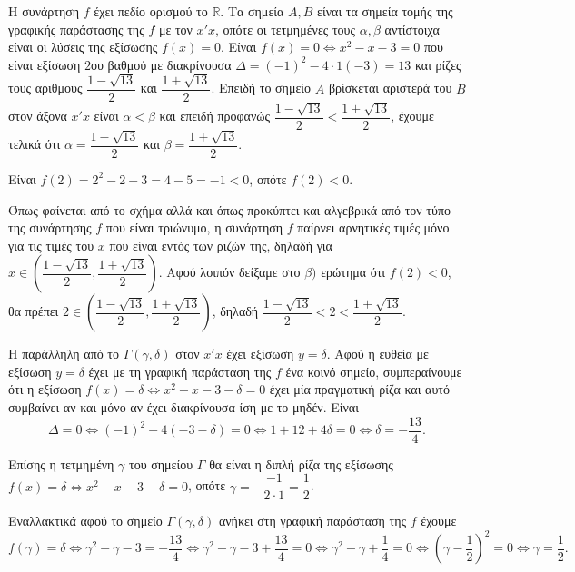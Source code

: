 
\begin{alist}
\item Η συνάρτηση $f$ έχει πεδίο ορισμού το $\mathbb{R}$. Τα σημεία $A, B$ είναι τα σημεία τομής της γραφικής παράστασης της $f$ με τον $x'x$, οπότε οι τετμημένες τους $\alpha, \beta$ αντίστοιχα είναι οι λύσεις της εξίσωσης $f(x) = 0$. Είναι $f(x) = 0 \Leftrightarrow x^2 - x - 3 = 0$
που είναι εξίσωση $2$ου βαθμού με διακρίνουσα $\Delta = (-1)^2 - 4 \cdot 1(-3) = 13$ και ρίζες τους αριθμούς
$\dfrac{1 - \sqrt{13}}{2}$ και $\dfrac{1 + \sqrt{13}}{2}$. Επειδή το σημείο $A$ βρίσκεται αριστερά του $B$ στον άξονα
$x'x$ είναι $\alpha < \beta$ και επειδή προφανώς $\dfrac{1 - \sqrt{13}}{2} < \dfrac{1 + \sqrt{13}}{2}$, έχουμε τελικά ότι $\alpha = \dfrac{1 - \sqrt{13}}{2}$ και $\beta = \dfrac{1 + \sqrt{13}}{2}$.

\item Είναι $f(2) = 2^2 - 2 - 3 = 4 - 5 = -1 < 0$, οπότε $f(2) < 0$.

\item Όπως φαίνεται από το σχήμα αλλά και όπως προκύπτει και αλγεβρικά από τον τύπο της συνάρτησης $f$ που είναι τριώνυμο, η συνάρτηση $f$ παίρνει αρνητικές
τιμές μόνο για τις τιμές του $x$ που είναι εντός των ριζών της, δηλαδή για
$x \in \left( \dfrac{1 - \sqrt{13}}{2}, \dfrac{1 + \sqrt{13}}{2} \right)$. Αφού λοιπόν δείξαμε στο $\beta)$ ερώτημα ότι $f(2) < 0$, θα πρέπει
$2 \in \left( \dfrac{1 - \sqrt{13}}{2}, \dfrac{1 + \sqrt{13}}{2} \right)$, δηλαδή $\dfrac{1 - \sqrt{13}}{2} < 2 < \dfrac{1 + \sqrt{13}}{2}$.

\item Η παράλληλη από το $\Gamma(\gamma, \delta)$ στον $x'x$ έχει εξίσωση $y = \delta$. Αφού η ευθεία με εξίσωση $y = \delta$ έχει με τη γραφική παράσταση της $f$ ένα κοινό σημείο,
συμπεραίνουμε ότι η εξίσωση $f(x) = \delta \Leftrightarrow x^2 - x - 3 - \delta = 0$ έχει μία πραγματική
ρίζα και αυτό συμβαίνει αν και μόνο αν έχει διακρίνουσα ίση με το μηδέν. Είναι
\[\Delta = 0 \Leftrightarrow (-1)^2 - 4(-3 - \delta) = 0 \Leftrightarrow 1 + 12 + 4\delta = 0 \Leftrightarrow \delta = -\dfrac{13}{4}.\]

Επίσης η τετμημένη $\gamma$ του σημείου $\Gamma$ θα είναι η διπλή ρίζα της εξίσωσης
$f(x) = \delta \Leftrightarrow x^2 - x - 3 - \delta = 0$, οπότε $\gamma = -\dfrac{-1}{2 \cdot 1} = \dfrac{1}{2}$.

Εναλλακτικά αφού το σημείο $\Gamma(\gamma, \delta)$ ανήκει στη γραφική παράσταση της $f$ έχουμε
\[f(\gamma) = \delta \Leftrightarrow \gamma^2 - \gamma - 3 = -\dfrac{13}{4} \Leftrightarrow \gamma^2 - \gamma - 3 + \dfrac{13}{4} = 0 \Leftrightarrow \gamma^2 - \gamma + \dfrac{1}{4} = 0 \Leftrightarrow \left(\gamma - \dfrac{1}{2}\right)^2 = 0 \Leftrightarrow \gamma = \dfrac{1}{2}.\]
\end{alist}


